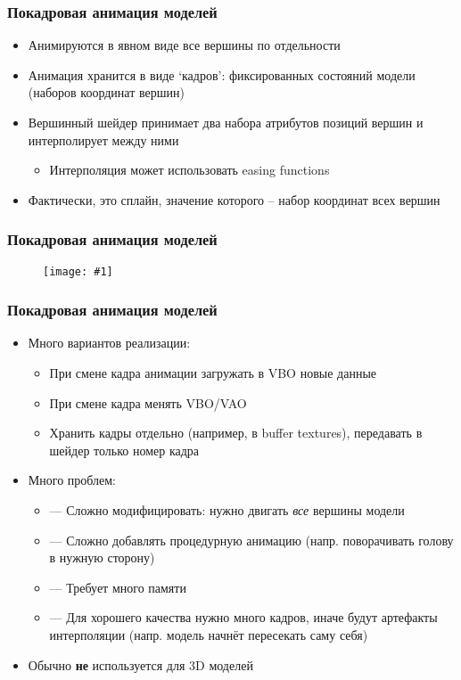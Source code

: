 \documentclass[10pt]{beamer}
\newcommand{\slideimage}[1]{
  \begin{figure}
    \begin{adjustbox}{width=\textwidth, totalheight=\textheight-2\baselineskip-2\baselineskip,keepaspectratio}
      \texttt{[image: \#1]}
    \end{adjustbox}
  \end{figure}
}
\begin{document}
\begin{frame}[fragile]
\frametitle{Покадровая анимация моделей}
\begin{itemize}
\item Анимируются в явном виде все вершины по отдельности
\pause
\item Анимация хранится в виде `кадров': фиксированных состояний модели (наборов координат вершин)
\pause
\item Вершинный шейдер принимает два набора атрибутов позиций вершин и интерполирует между ними
\begin{itemize}
\item Интерполяция может использовать easing functions
\end{itemize}
\pause
\item Фактически, это сплайн, значение которого -- набор координат всех вершин
\end{itemize}
\end{frame}

\begin{frame}[fragile]
\frametitle{Покадровая анимация моделей}
\slideimage{keyframes.jpg}
\end{frame}

\begin{frame}[fragile]
\frametitle{Покадровая анимация моделей}
\begin{itemize}
\item Много вариантов реализации:
\begin{itemize}
\item При смене кадра анимации загружать в VBO новые данные
\item При смене кадра менять VBO/VAO
\item Хранить кадры отдельно (например, в buffer textures), передавать в шейдер только номер кадра
\end{itemize}
\pause
\item Много проблем:
\pause
\begin{itemize}
\item {\color{red}---} Сложно модифицировать: нужно двигать \textit{все} вершины модели
\pause
\item {\color{red}---} Сложно добавлять процедурную анимацию (напр. поворачивать голову в нужную сторону)
\pause
\item {\color{red}---} Требует много памяти
\pause
\item {\color{red}---} Для хорошего качества нужно много кадров, иначе будут артефакты интерполяции (напр. модель начнёт пересекать саму себя)
\end{itemize}
\pause
\item Обычно \textbf{не} используется для 3D моделей
\end{itemize}
\end{frame}
\end{document}
